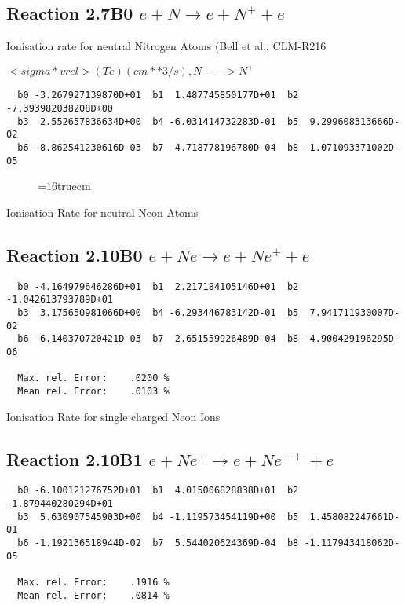 \documentclass[12pt]{article}
\begin{document}
\subsection{
Reaction 2.7B0   $e + N \rightarrow e + N^+ + e  $
}

  Ionisation rate for neutral Nitrogen Atoms
  (Bell et al., CLM-R216

  $<sigma*vrel>(Te)  (cm**3/s), N --> N^+$

\begin{small}\begin{verbatim}
  b0 -3.267927139870D+01  b1  1.487745850177D+01  b2 -7.393982038208D+00
  b3  2.552657836634D+00  b4 -6.031414732283D-01  b5  9.299608313666D-02
  b6 -8.862541230616D-03  b7  4.718778196780D-04  b8 -1.071093371002D-05

\end{verbatim}\end{small}
\begin{figure} \label{2.7B0}
\epsfxsize=16truecm
\end{figure}
\newpage


 Ionisation Rate for neutral Neon Atoms

\subsection{
Reaction 2.10B0   $e + Ne \rightarrow e + Ne^+ + e  $
}

\begin{small}\begin{verbatim}
  b0 -4.164979646286D+01  b1  2.217184105146D+01  b2 -1.042613793789D+01
  b3  3.175650981066D+00  b4 -6.293446783142D-01  b5  7.941711930007D-02
  b6 -6.140370720421D-03  b7  2.651559926489D-04  b8 -4.900429196295D-06

  Max. rel. Error:    .0200 %
  Mean rel. Error:    .0103 %

\end{verbatim}\end{small}

 Ionisation Rate for single charged Neon Ions

\subsection{
Reaction 2.10B1  $ e + Ne^+ \rightarrow e + Ne^{++} + e $
}

\begin{small}\begin{verbatim}
  b0 -6.100121276752D+01  b1  4.015006828838D+01  b2 -1.879440280294D+01
  b3  5.630907545903D+00  b4 -1.119573454119D+00  b5  1.458082247661D-01
  b6 -1.192136518944D-02  b7  5.544020624369D-04  b8 -1.117943418062D-05

  Max. rel. Error:    .1916 %
  Mean rel. Error:    .0814 %

\end{verbatim}\end{small}
\end{document}
